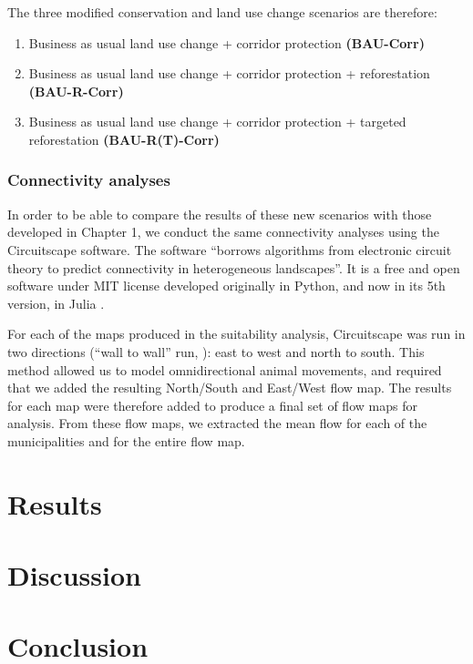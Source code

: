 The three modified conservation and land use change scenarios are therefore:
\begin{enumerate}
	\item Business as usual land use change + corridor protection \textbf{(BAU-Corr)}
	\item Business as usual land use change + corridor protection + reforestation \textbf{(BAU-R-Corr)}
	\item Business as usual land use change + corridor protection + targeted reforestation \textbf{(BAU-R(T)-Corr)} \\
\end{enumerate}

\subsubsection{Connectivity analyses}

In order to be able to compare the results of these new scenarios with those developed in Chapter 1, we conduct the same connectivity analyses using the Circuitscape software. The software “borrows algorithms from electronic circuit theory to predict connectivity in heterogeneous landscapes''. It is a free and open software under MIT license developed originally in Python, and now in its 5th version, in Julia \citep{circuitjulia}.

For each of the maps produced in the suitability analysis, Circuitscape was run in two directions (“wall to wall” run, \cite{mcrae_conserving_2016}): east to west and north to south. This method allowed us to model omnidirectional animal movements, and required that we added the resulting North/South and East/West flow map. The results for each map were therefore added to produce a final set of flow maps for analysis. From these flow maps, we extracted the mean flow for each of the municipalities and for the entire flow map. \\

\section{Results}


\section{Discussion}


\section{Conclusion}

